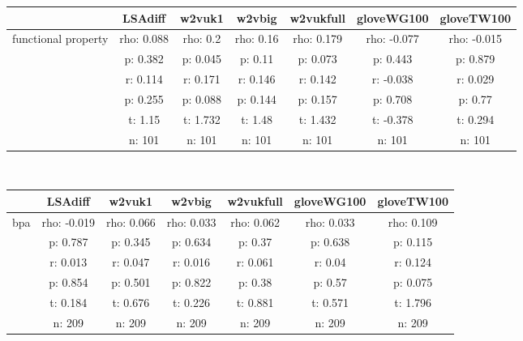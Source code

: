 \documentclass{article}
\begin{document}
\begin{tabular}{ccccccc|}\cline{2-7}
&\multicolumn{1}{|c}{LSAdiff} & w2vuk1 & w2vbig & w2vukfull & gloveWG100 & gloveTW100 \\\hline
\multicolumn{1}{|c|}{\multirow{6}{*}{functional property}} & rho: 0.088 & rho: 0.2 & rho: 0.16 & rho: 0.179 & rho: -0.077 & rho: -0.015 \\
\multicolumn{1}{|c|}{} & p: 0.382 & p: 0.045 & p: 0.11 & p: 0.073 & p: 0.443 & p: 0.879 \\
\multicolumn{1}{|c|}{} & r: 0.114 & r: 0.171 & r: 0.146 & r: 0.142 & r: -0.038 & r: 0.029 \\
\multicolumn{1}{|c|}{} & p: 0.255 & p: 0.088 & p: 0.144 & p: 0.157 & p: 0.708 & p: 0.77 \\
\multicolumn{1}{|c|}{} & t: 1.15 & t: 1.732 & t: 1.48 & t: 1.432 & t: -0.378 & t: 0.294 \\
\multicolumn{1}{|c|}{} & n: 101 & n: 101 & n: 101 & n: 101 & n: 101 & n: 101 \\
\hline
\end{tabular}\\
\begin{tabular}{ccccccc|}\cline{2-7}
&\multicolumn{1}{|c}{LSAdiff} & w2vuk1 & w2vbig & w2vukfull & gloveWG100 & gloveTW100 \\\hline
\multicolumn{1}{|c|}{\multirow{6}{*}{bpa}} & rho: -0.019 & rho: 0.066 & rho: 0.033 & rho: 0.062 & rho: 0.033 & rho: 0.109 \\
\multicolumn{1}{|c|}{} & p: 0.787 & p: 0.345 & p: 0.634 & p: 0.37 & p: 0.638 & p: 0.115 \\
\multicolumn{1}{|c|}{} & r: 0.013 & r: 0.047 & r: 0.016 & r: 0.061 & r: 0.04 & r: 0.124 \\
\multicolumn{1}{|c|}{} & p: 0.854 & p: 0.501 & p: 0.822 & p: 0.38 & p: 0.57 & p: 0.075 \\
\multicolumn{1}{|c|}{} & t: 0.184 & t: 0.676 & t: 0.226 & t: 0.881 & t: 0.571 & t: 1.796 \\
\multicolumn{1}{|c|}{} & n: 209 & n: 209 & n: 209 & n: 209 & n: 209 & n: 209 \\
\hline
\end{tabular}\\
\end{document}
